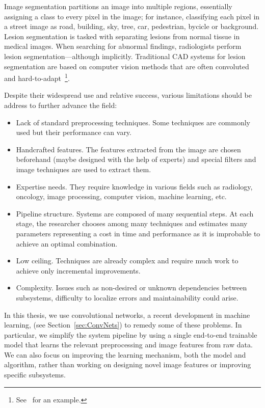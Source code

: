 Image segmentation partitions an image into multiple regions, essentially assigning a class to every pixel in the image; for instance, classifying each pixel in a street image as road, building, sky, tree, car, pedestrian, bycicle or background. Lesion segmentation is tasked with separating lesions from normal tissue in medical images. When searching for abnormal findings, radiologists perform lesion segmentation---although implicitly. Traditional CAD systems for lesion segmentation are based on computer vision methods that are often convoluted and hard-to-adapt~\footnote{See~\cite{Ashraf2013} for an example.}. 

Despite their widespread use and relative success, various limitations should be address to further advance the field:
\begin{itemize}
	\item Lack of standard preprocessing techniques. Some techniques are commonly used but their performance can vary.
	\item Handcrafted features. The features extracted from the image are chosen beforehand (maybe designed with the help of experts) and special filters and image techniques are used to extract them.
	\item Expertise needs. They require knowledge in various fields such as radiology, oncology, image processing, computer vision, machine learning, etc.
	\item Pipeline structure. Systems are composed of many sequential steps. At each stage, the researcher chooses among many techniques and estimates many parameters representing a cost in time and performance as it is improbable to achieve an optimal combination.
	\item Low ceiling. Techniques are already complex and require much work to achieve only incremental improvements.
	\item Complexity. Issues such as non-desired or unknown dependencies between subsystems, difficulty to localize errors and maintainability could arise. 
\end{itemize}

In this thesis, we use convolutional networks, a recent development in machine learning, (see Section~\ref{sec:ConvNets}) to remedy some of these problems. In particular, we simplify the system pipeline by using a single end-to-end trainable model that learns the relevant preprocessing and image features from raw data. We can also focus on improving the learning mechanism, both the model and algorithm, rather than working on designing novel image features or improving specific subsystems.
